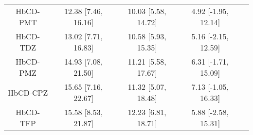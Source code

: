 \documentclass[8pt]{article}
\begin{document}
\begin{center}
\begin{footnotesize}
\begin{longtable}{|ccccc|}
HbCD-PMT & 12.38 [7.46, 16.16] & 10.03 [5.58, 14.72] & 4.92 [-1.95, 12.14] \\
HbCD-TDZ & 13.02 [7.71, 16.83] & 10.58 [5.93, 15.35] & 5.16 [-2.15, 12.59] \\
HbCD-PMZ & 14.93 [7.08, 21.50] & 11.21 [5.58, 17.67] & 6.31 [-1.71, 15.09] \\
HbCD-CPZ & 15.65 [7.16, 22.67] & 11.32 [5.07, 18.48] & 7.13 [-1.05, 16.33] \\
HbCD-TFP & 15.58 [8.53, 21.87] & 12.23 [6.81, 18.71] & 5.88 [-2.58, 15.31] \\
\end{longtable}
\end{footnotesize}
\end{center}
\end{document}
